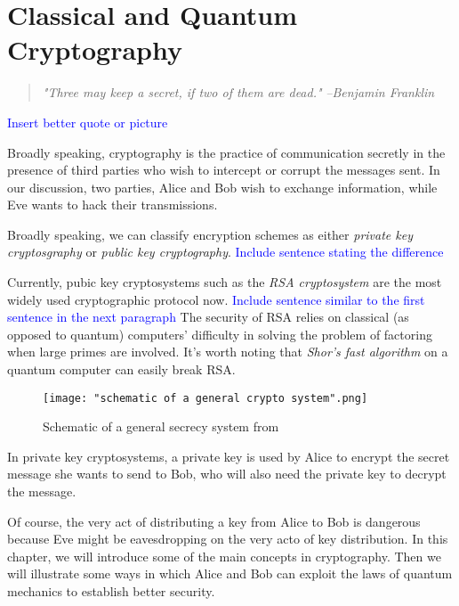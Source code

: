 
\chapter{Classical and Quantum Cryptography} %

\label{Chapter5-cryptography} %


\begin{quote}
\textit{"Three may keep a secret, if two of them are dead."} \textit{--Benjamin Franklin}
\end{quote}

\textcolor{blue}{Insert better quote or picture}



Broadly speaking, cryptography is the practice of communication secretly in the presence of third parties who wish to intercept or corrupt the messages sent. In our discussion, two parties, Alice and Bob wish to exchange information, while Eve wants to hack their transmissions.

Broadly speaking, we can classify encryption schemes as either {\emph{private key cryptosgraphy}} or {\emph{public key cryptography}}.  {\textcolor{blue}{Include sentence stating the difference}}  

Currently, pubic key cryptosystems such as the {\emph{RSA cryptosystem}} are the most widely used cryptographic protocol now.  {\textcolor{blue}{Include sentence similar to the first sentence in the next paragraph}} The security of RSA relies on classical (as opposed to quantum) computers' difficulty in solving the problem of factoring when large primes are involved. It's worth noting that {\emph{Shor's fast algorithm}} on a quantum computer can easily break RSA.

\begin{figure}[h]
    \centering
    \texttt{[image: "schematic of a general crypto system".png]}
    \caption{Schematic of a general secrecy system from \cite{shannon1949communication}}
    \label{fig:general crypto schematic}
\end{figure}

In private key cryptosystems, a private key is used by Alice to encrypt the secret message she wants to send to Bob, who will also need the private key to decrypt the message. 


Of course, the very act of distributing a key from Alice to Bob is dangerous because Eve might be eavesdropping on the very acto of key distribution. In this chapter, we will introduce some of the main concepts in cryptography.  Then we will illustrate some ways in which Alice and Bob can exploit the laws of quantum mechanics to establish better security. 

